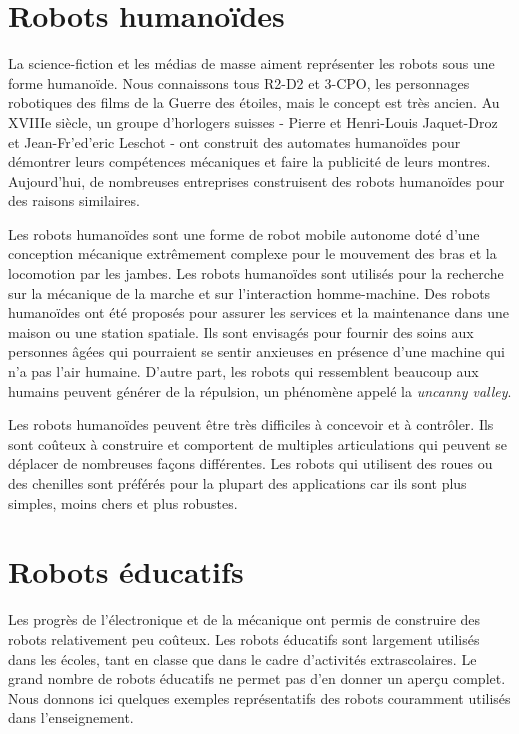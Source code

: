 {\section{Robots humanoïdes}

La science-fiction et les médias de masse aiment représenter les robots sous une forme humanoïde. Nous connaissons tous R2-D2 et 3-CPO, les personnages robotiques des films de la Guerre des étoiles, mais le concept est très ancien. Au XVIIIe siècle, un groupe d'horlogers suisses - Pierre et Henri-Louis Jaquet-Droz et Jean-Fr'{e}d'{e}ric Leschot - ont construit des automates humanoïdes pour démontrer leurs compétences mécaniques et faire la publicité de leurs montres. Aujourd'hui, de nombreuses entreprises construisent des robots humanoïdes pour des raisons similaires.

Les robots humanoïdes sont une forme de robot mobile autonome doté d'une conception mécanique extrêmement complexe pour le mouvement des bras et la locomotion par les jambes. Les robots humanoïdes sont utilisés pour la recherche sur la mécanique de la marche et sur l'interaction homme-machine. Des robots humanoïdes ont été proposés pour assurer les services et la maintenance dans une maison ou une station spatiale. Ils sont envisagés pour fournir des soins aux personnes âgées qui pourraient se sentir anxieuses en présence d'une machine qui n'a pas l'air humaine. D'autre part, les robots qui ressemblent beaucoup aux humains peuvent générer de la répulsion, un phénomène appelé la \emph{uncanny valley}.

Les robots humanoïdes peuvent être très difficiles à concevoir et à contrôler. Ils sont coûteux à construire et comportent de multiples articulations qui peuvent se déplacer de nombreuses façons différentes. Les robots qui utilisent des roues ou des chenilles sont préférés pour la plupart des applications car ils sont plus simples, moins chers et plus robustes.

\section{Robots éducatifs}\label{s.educational}

Les progrès de l'électronique et de la mécanique ont permis de construire des robots relativement peu coûteux. Les robots éducatifs sont largement utilisés dans les écoles, tant en classe que dans le cadre d'activités extrascolaires. Le grand nombre de robots éducatifs ne permet pas d'en donner un aperçu complet. Nous donnons ici quelques exemples représentatifs des robots couramment utilisés dans l'enseignement.

}
